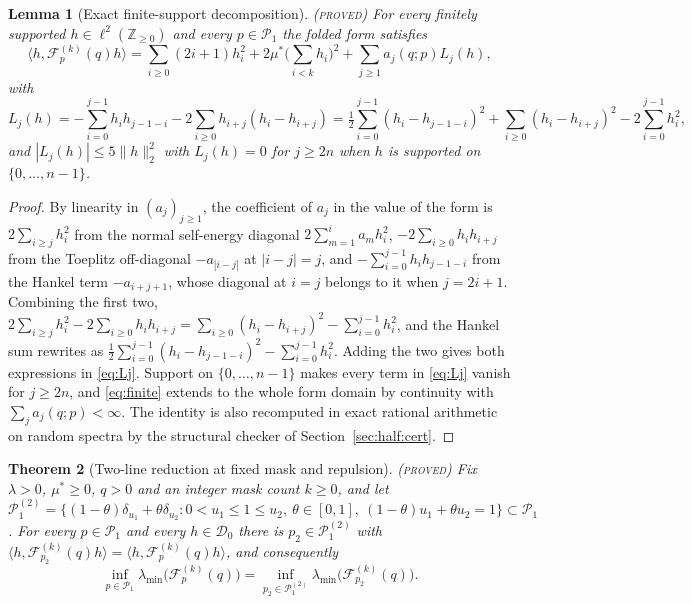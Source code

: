 \documentclass[11pt]{article}
\newcommand{\Fcal}{\mathcal F}
\newcommand{\muS}{\mu^{*}}
\newtheorem{theorem}{Theorem}[section]
\newtheorem{lemma}[theorem]{Lemma}
\theoremstyle{definition}
\theoremstyle{remark}
\newcommand{\proved}{\textnormal{\textsc{(proved)}}}
\begin{document}
\begin{lemma}[Exact finite-support decomposition]\label{lem:decomp}\proved
For every finitely supported $h\in\ell^2(\mathbb Z_{\ge0})$ and every $p\in\mathcal P_1$
the folded form satisfies
\begin{equation}\label{eq:finite}
\langle h,\Fcal_p^{(k)}(q)h\rangle=\sum_{i\ge0}(2i+1)h_i^2
+2\muS\Big(\sum_{i<k}h_i\Big)^2+\sum_{j\ge1}a_j(q;p)L_j(h),
\end{equation}
with
\begin{equation}\label{eq:Lj}
L_j(h)=-\sum_{i=0}^{j-1}h_ih_{j-1-i}-2\sum_{i\ge0}h_{i+j}(h_i-h_{i+j})
=\tfrac12\sum_{i=0}^{j-1}(h_i-h_{j-1-i})^2+\sum_{i\ge0}(h_i-h_{i+j})^2
-2\sum_{i=0}^{j-1}h_i^2,
\end{equation}
and $|L_j(h)|\le5\|h\|_2^2$ with $L_j(h)=0$ for $j\ge2n$ when $h$ is supported on
$\{0,\dots,n-1\}$.
\end{lemma}

\begin{proof}
By linearity in $(a_j)_{j\ge1}$, the coefficient of $a_j$ in the value of the form is
$2\sum_{i\ge j}h_i^2$ from the normal self-energy diagonal $2\sum_{m=1}^{i}a_mh_i^2$,
$-2\sum_{i\ge0}h_ih_{i+j}$ from the Toeplitz off-diagonal $-a_{|i-j|}$ at
$|i-j|=j$, and $-\sum_{i=0}^{j-1}h_ih_{j-1-i}$ from the Hankel term $-a_{i+j+1}$, whose
diagonal at $i=j$ belongs to it when $j=2i+1$. Combining the first two,
$2\sum_{i\ge j}h_i^2-2\sum_{i\ge0}h_ih_{i+j}
=\sum_{i\ge0}(h_i-h_{i+j})^2-\sum_{i=0}^{j-1}h_i^2$, and the Hankel sum rewrites as
$\tfrac12\sum_{i=0}^{j-1}(h_i-h_{j-1-i})^2-\sum_{i=0}^{j-1}h_i^2$. Adding the two gives
both expressions in \eqref{eq:Lj}. Support on $\{0,\dots,n-1\}$ makes every term in
\eqref{eq:Lj} vanish for $j\ge2n$, and \eqref{eq:finite} extends to the whole form domain
by continuity with $\sum_j a_j(q;p)<\infty$. The identity is also recomputed in exact
rational arithmetic on random spectra by the structural checker of
Section~\ref{sec:half:cert}.
\end{proof}

\begin{theorem}[Two-line reduction at fixed mask and repulsion]\label{thm:twodelta}\proved
Fix $\lambda>0$, $\muS\ge0$, $q>0$ and an integer mask count $k\ge0$, and let
$\mathcal P_1^{(2)}=\{(1-\theta)\delta_{u_1}+\theta\delta_{u_2}:0<u_1\le1\le u_2,\
\theta\in[0,1],\ (1-\theta)u_1+\theta u_2=1\}\subset\mathcal P_1$. For every
$p\in\mathcal P_1$ and every $h\in\mathcal D_0$ there is $p_2\in\mathcal P_1^{(2)}$ with
$\langle h,\Fcal_{p_2}^{(k)}(q)h\rangle=\langle h,\Fcal_p^{(k)}(q)h\rangle$, and
consequently
\[
\inf_{p\in\mathcal P_1}\lambda_{\min}\big(\Fcal_p^{(k)}(q)\big)
=\inf_{p_2\in\mathcal P_1^{(2)}}\lambda_{\min}\big(\Fcal_{p_2}^{(k)}(q)\big).
\]
\end{theorem}
\end{document}
